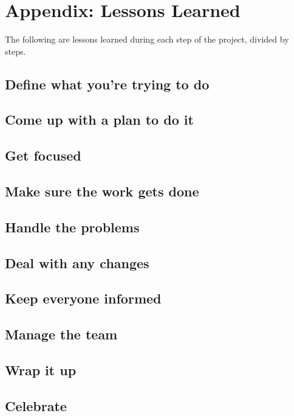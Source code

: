 %
\chapter{Appendix: Lessons Learned}\label{ch:appendix:-lessons-learned}

The following are lessons learned during each step of the project, divided by steps.

\section*{Define what you’re trying to do}


\section*{Come up with a plan to do it}


\section*{Get focused}


\section*{Make sure the work gets done}


\section*{Handle the problems}


\section*{Deal with any changes}


\section*{Keep everyone informed}


\section*{Manage the team}


\section*{Wrap it up}


\section*{Celebrate}
